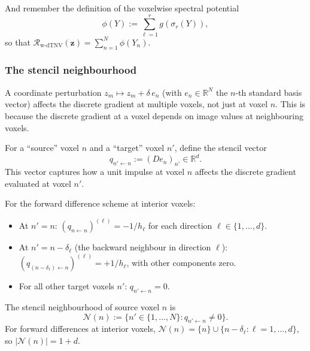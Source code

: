 And remember the definition of the voxelwise spectral potential
\begin{equation}
\phi(Y) := \sum_{\ell=1}^{r} g(\sigma_r(Y)),
\end{equation}
so that $\mathcal{R}_{\mathrm{w\text{-}dTNV}}(\bm{z}) = \sum_{n=1}^N \phi(Y_n)$.

\subsubsection{The stencil neighbourhood}

A coordinate perturbation $z_m \mapsto z_m + \delta\, e_n$ (with $e_n \in \mathbb{R}^N$ the $n$-th standard basis vector) affects the discrete gradient at multiple voxels, not just at voxel $n$. This is because the discrete gradient at a voxel depends on image values at neighbouring voxels.

\begin{definition}
For a ``source'' voxel $n$ and a ``target'' voxel $n'$, define the stencil vector
\begin{equation}
q_{n' \leftarrow n} := (D e_n)_{n'} \in \mathbb{R}^d.
\end{equation}
This vector captures how a unit impulse at voxel $n$ affects the discrete gradient evaluated at voxel $n'$.
\end{definition}

\begin{proposition}
\label{prop:stencil_vectors}
For the forward difference scheme at interior voxels:
\begin{itemize}
    \item At $n' = n$: $(q_{n \leftarrow n})^{(\ell)} = -1/h_\ell$ for each direction $\ell \in \{1, \ldots, d\}$.
    \item At $n' = n - \delta_\ell$ (the backward neighbour in direction $\ell$): $(q_{(n-\delta_\ell) \leftarrow n})^{(\ell)} = +1/h_\ell$, with other components zero.
    \item For all other target voxels $n'$: $q_{n' \leftarrow n} = 0$.
\end{itemize}
\end{proposition}

\begin{definition}
The stencil neighbourhood of source voxel $n$ is
\begin{equation}
\mathcal{N}(n) := \{ n' \in \{1, \ldots, N\} : q_{n' \leftarrow n} \neq 0 \}.
\end{equation}
For forward differences at interior voxels, $\mathcal{N}(n) = \{n\} \cup \{n - \delta_\ell : \ell = 1, \ldots, d\}$, so $|\mathcal{N}(n)| = 1 + d$.
\end{definition}

